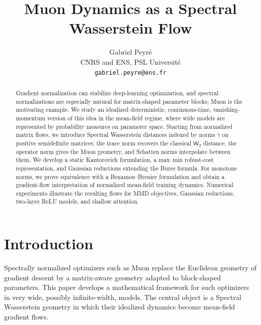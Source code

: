 \documentclass{article}
\title{Muon Dynamics as a Spectral Wasserstein Flow}
\author{Gabriel Peyr\'e\\CNRS and ENS, PSL Universit\'e\\\texttt{gabriel.peyre@ens.fr}}
\newcommand{\Wtwo}{\mathsf{W}_2}
\begin{document}
\maketitle

\begin{abstract}
Gradient normalization can stabilize deep-learning optimization, and spectral
normalizations are especially natural for matrix-shaped parameter blocks;
Muon is the motivating example. We study an idealized deterministic,
continuous-time, vanishing-momentum version of this idea in the mean-field
regime, where wide models are represented by probability measures on parameter
space. Starting from normalized matrix flows, we introduce Spectral
Wasserstein distances indexed by norms $\gamma$ on positive semidefinite
matrices: the trace norm recovers the classical $\Wtwo$ distance, the operator
norm gives the Muon geometry, and Schatten norms interpolate between them. We
develop a static Kantorovich formulation, a max--min robust-cost
representation, and Gaussian reductions extending the Bures formula. For
monotone norms, we prove equivalence with a Benamou--Brenier formulation and
obtain a gradient-flow interpretation of normalized mean-field training
dynamics. Numerical experiments illustrate the resulting flows for MMD
objectives, Gaussian reductions, two-layer ReLU models, and shallow attention.
\end{abstract}


\section{Introduction}
\label{sec:intro}

Spectrally normalized optimizers such as Muon replace the Euclidean geometry
of gradient descent by a matrix-aware geometry adapted to block-shaped
parameters. This paper develops a mathematical framework for such optimizers
in very wide, possibly infinite-width, models. The central object is a
Spectral Wasserstein geometry in which their idealized dynamics become
mean-field gradient flows.
\end{document}
